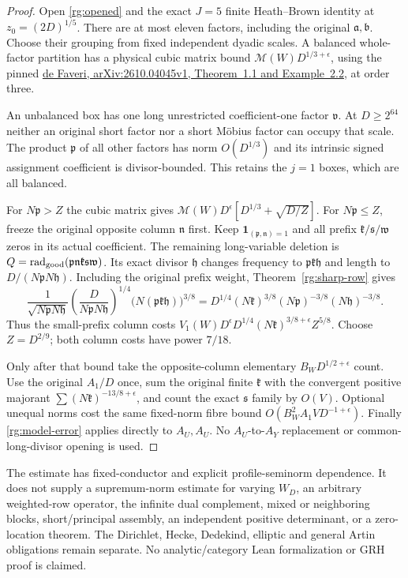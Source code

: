 \begin{proof}
Open \eqref{rg:opened} and the exact \(J=5\) finite
Heath--Brown identity at \(z_0=(2D)^{1/5}\).
There are at most eleven factors, including the original
\(\mathfrak a,\mathfrak b\).
Choose their grouping from fixed independent dyadic scales.
A balanced whole-factor partition has a physical cubic matrix
bound \(\mathcal M(W)D^{1/3+\epsilon}\), using the pinned
\href{https://arxiv.org/abs/2610.04045v1}{de Faveri,
arXiv:2610.04045v1, Theorem~1.1 and Example~2.2}, at order three.

An unbalanced box has one long unrestricted coefficient-one factor
\(\mathfrak v\). At \(D\ge2^{64}\) neither an original short factor
nor a short M\"obius factor can occupy that scale. The product
\(\mathfrak p\) of all other factors has norm \(O(D^{1/3})\)
and its intrinsic signed assignment coefficient is divisor-bounded.
This retains the \(j=1\) boxes, which are all balanced.

For \(N\mathfrak p>Z\) the cubic matrix gives
\(\mathcal M(W)D^\epsilon[D^{1/3}+\sqrt{D/Z}]\).
For \(N\mathfrak p\le Z\), freeze the original opposite column
\(\mathfrak n\) first. Keep
\(\mathbf1_{(\mathfrak p,\mathfrak n)=1}\) and all prefix
\(\mathfrak k/\mathfrak s/\mathfrak w\) zeros in its actual coefficient.
The remaining long-variable deletion is
\(Q=\operatorname{rad}_{\rm good}(\mathfrak p\mathfrak n
\mathfrak k\mathfrak s\mathfrak w)\).
Its exact divisor \(\mathfrak h\) changes frequency to
\(\mathfrak p\mathfrak k\mathfrak h\) and length to
\(D/(N\mathfrak pN\mathfrak h)\).
Including the original prefix weight, Theorem~\ref{rg:sharp-row} gives
\begin{equation}\label{rg:small-prefix-weight}
 \frac{1}{\sqrt{N\mathfrak pN\mathfrak h}}
 \left(\frac D{N\mathfrak pN\mathfrak h}\right)^{1/4}
 \bigl(N(\mathfrak p\mathfrak k\mathfrak h)\bigr)^{3/8}
 =D^{1/4}(N\mathfrak k)^{3/8}
       (N\mathfrak p)^{-3/8}(N\mathfrak h)^{-3/8}.
\end{equation}
Thus the small-prefix column costs
\(V_1(W)D^\epsilon D^{1/4}(N\mathfrak k)^{3/8+\epsilon}Z^{5/8}\).
Choose \(Z=D^{2/9}\); both column costs have power \(7/18\).

Only after that bound take the opposite-column elementary
\(B_WD^{1/2+\epsilon}\) count. Use the original \(A_1/D\) once,
sum the original finite \(\mathfrak k\) with the convergent positive
majorant \(\sum(N\mathfrak k)^{-13/8+\epsilon}\), and count the exact
\(\mathfrak s\) family by \(O(V)\).
Optional unequal norms cost the same fixed-norm fibre bound
\(O(B_W^2A_1VD^{-1+\epsilon})\).
Finally \eqref{rg:model-error} applies directly to \(A_U,A_U\).
No \(A_U\)-to-\(A_Y\) replacement or common-long-divisor opening is used.
\end{proof}

The estimate has fixed-conductor and explicit profile-seminorm
dependence. It does not supply a supremum-norm estimate for varying
\(W_D\), an arbitrary weighted-row operator, the infinite dual
complement, mixed or neighboring blocks, short/principal assembly,
an independent positive determinant, or a zero-location theorem.
The Dirichlet, Hecke, Dedekind, elliptic and general Artin obligations
remain separate. No analytic/category Lean formalization or GRH proof
is claimed.
